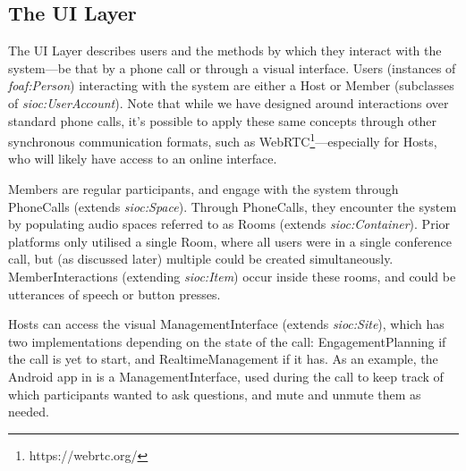\subsection{The UI Layer}

The UI Layer describes users and the methods by which they interact with the system---be that by a phone call or through a visual interface. Users (instances of \textit{foaf:Person}) interacting with the system are either a Host or Member (subclasses of \textit{sioc:UserAccount}). Note that while we have designed \ONT{} around interactions over standard phone calls, it's possible to apply these same concepts through other synchronous communication formats, such as WebRTC\footnote{https://webrtc.org/}---especially for Hosts, who will likely have access to an online interface.

Members are regular participants, and engage with the system through PhoneCalls (extends \textit{sioc:Space}). Through PhoneCalls, they encounter the system by populating audio spaces referred to as Rooms (extends \textit{sioc:Container}). Prior platforms only utilised a single Room, where all users were in a single conference call, but (as discussed later) multiple could be created simultaneously. MemberInteractions (extending \textit{sioc:Item}) occur inside these rooms, and could be utterances of speech or button presses. 

Hosts can access the visual ManagementInterface (extends \textit{sioc:Site}), which has two implementations depending on the state of the call: EngagementPlanning if the call is yet to start, and RealtimeManagement if it has. As an example, the Android app in \cite{Kazakos2016} is a ManagementInterface, used during the call to keep track of which participants wanted to ask questions, and mute and unmute them as needed. 

